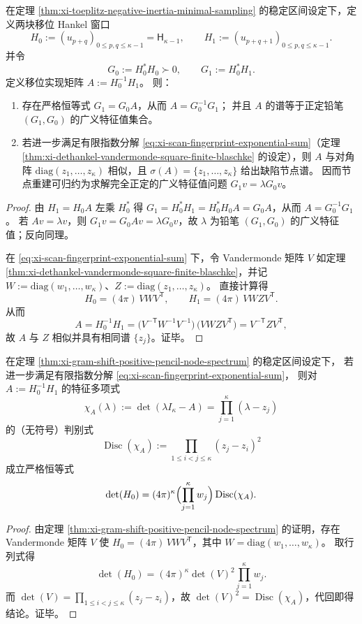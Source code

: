 \begin{theorem}\label{thm:xi-gram-shift-positive-pencil-node-spectrum}
在定理 \ref{thm:xi-toeplitz-negative-inertia-minimal-sampling} 的稳定区间设定下，定义两块移位 Hankel 窗口
\[
H_0:=(u_{p+q})_{0\le p,q\le \kappa-1}=\mathsf H_{\kappa-1},
\qquad
H_1:=(u_{p+q+1})_{0\le p,q\le \kappa-1}.
\]
并令
\[
G_0:=H_0^\ast H_0\succ0,\qquad G_1:=H_0^\ast H_1.
\]
定义移位实现矩阵 \(A:=H_0^{-1}H_1\)。
则：
\begin{enumerate}
  \item 存在严格恒等式 \(G_1=G_0A\)，从而 \(A=G_0^{-1}G_1\)；
  并且 \(A\) 的谱等于正定铅笔 \((G_1,G_0)\) 的广义特征值集合。
  \item 若进一步满足有限指数分解 \eqref{eq:xi-scan-fingerprint-exponential-sum}（定理 \ref{thm:xi-dethankel-vandermonde-square-finite-blaschke} 的设定），则 \(A\) 与对角阵 \(\mathrm{diag}(z_1,\dots,z_\kappa)\) 相似，且 \(\sigma(A)=\{z_1,\dots,z_\kappa\}\) 给出缺陷节点谱。
  因而节点重建可归约为求解完全正定的广义特征值问题 \(G_1v=\lambda G_0v\)。
\end{enumerate}
\end{theorem}
\begin{proof}
由 \(H_1=H_0A\) 左乘 \(H_0^\ast\) 得 \(G_1=H_0^\ast H_1=H_0^\ast H_0A=G_0A\)，从而 \(A=G_0^{-1}G_1\)。
若 \(Av=\lambda v\)，则 \(G_1v=G_0Av=\lambda G_0v\)，故 \(\lambda\) 为铅笔 \((G_1,G_0)\) 的广义特征值；反向同理。
\par
在 \eqref{eq:xi-scan-fingerprint-exponential-sum} 下，令 Vandermonde 矩阵 \(V\) 如定理 \ref{thm:xi-dethankel-vandermonde-square-finite-blaschke}，并记 \(W:=\mathrm{diag}(w_1,\dots,w_\kappa)\)、\(Z:=\mathrm{diag}(z_1,\dots,z_\kappa)\)。
直接计算得
\[
H_0=(4\pi)\,VWV^{\mathsf T},
\qquad
H_1=(4\pi)\,VWZV^{\mathsf T}.
\]
从而
\[
A=H_0^{-1}H_1
=\bigl(V^{-{\mathsf T}}W^{-1}V^{-1}\bigr)\,\bigl(VWZV^{\mathsf T}\bigr)
=V^{-{\mathsf T}}ZV^{\mathsf T},
\]
故 \(A\) 与 \(Z\) 相似并具有相同谱 \(\{z_j\}\)。证毕。
\end{proof}

\begin{theorem}\label{thm:xi-hankel-determinant-gramshift-discriminant-identity}
在定理 \ref{thm:xi-gram-shift-positive-pencil-node-spectrum} 的稳定区间设定下，
若进一步满足有限指数分解 \eqref{eq:xi-scan-fingerprint-exponential-sum}，
则对 \(A:=H_0^{-1}H_1\) 的特征多项式
\[
\chi_A(\lambda):=\det(\lambda I_\kappa-A)=\prod_{j=1}^{\kappa}(\lambda-z_j)
\]
的（无符号）判别式
\[
\operatorname{Disc}(\chi_A):=\prod_{1\le i<j\le \kappa}(z_j-z_i)^2
\]
成立严格恒等式
\[
\det(H_0)
=(4\pi)^{\kappa}\Bigl(\prod_{j=1}^{\kappa} w_j\Bigr)\operatorname{Disc}(\chi_A).
\]
\end{theorem}
\begin{proof}
由定理 \ref{thm:xi-gram-shift-positive-pencil-node-spectrum} 的证明，存在 Vandermonde 矩阵 \(V\) 使
\(
H_0=(4\pi)\,V W V^{\mathsf T}
\)，其中 \(W=\mathrm{diag}(w_1,\dots,w_\kappa)\)。
取行列式得
\[
\det(H_0)=(4\pi)^\kappa\det(V)^2\prod_{j=1}^{\kappa}w_j.
\]
而 \(\det(V)=\prod_{1\le i<j\le\kappa}(z_j-z_i)\)，故 \(\det(V)^2=\operatorname{Disc}(\chi_A)\)，代回即得结论。证毕。
\end{proof}

